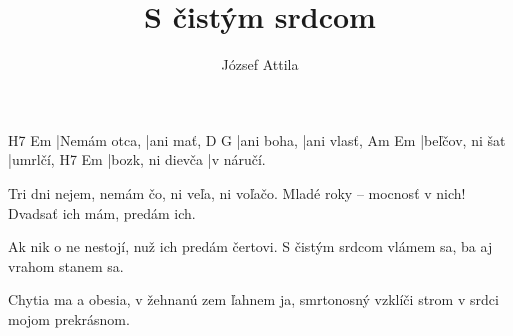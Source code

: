 \documentclass{song}
\title{S čistým srdcom}
\author{József Attila}
\begin{document}
\strophe
H7           Em
|Nemám otca, |ani mať,
D          G
|ani boha, |ani vlasť,
Am              Em
|beľčov, ni šat |umrlčí,
H7               Em
|bozk, ni dievča |v náručí. 
\endstrophe

\strophe*
Tri dni nejem, nemám čo,
ni veľa, ni voľačo.
Mladé roky -- mocnosť v nich!
Dvadsať ich mám, predám ich.
\endstrophe

\strophe*
Ak nik o ne nestojí,
nuž ich predám čertovi.
S čistým srdcom vlámem sa,
ba aj vrahom stanem sa.
\endstrophe

\strophe*
Chytia ma a obesia,
v žehnanú zem ľahnem ja,
smrtonosný vzklíči strom
v srdci mojom prekrásnom.
\endstrophe
\end{document}
